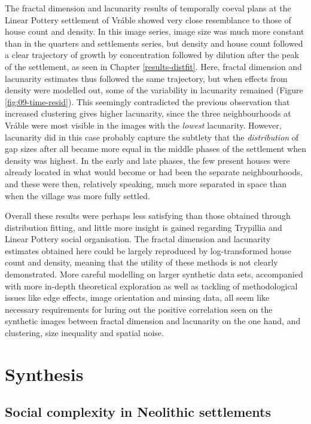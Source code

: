 \documentclass[
  12pt,
  a4paper, twoside]{book}
\begin{document}
The fractal dimension and lacunarity results of temporally coeval plans at the Linear Pottery settlement of Vráble showed very close resemblance to those of house count and density. In this image series, image size was much more constant than in the quarters and settlements series, but density and house count followed a clear trajectory of growth by concentration followed by dilution after the peak of the settlement, as seen in Chapter \ref{results-distfit}. Here, fractal dimension and lacunarity estimates thus followed the same trajectory, but when effects from density were modelled out, some of the variability in lacunarity remained (Figure \ref{fig:09-time-resid}). This seemingly contradicted the previous observation that increased clustering gives higher lacunarity, since the three neighbourhoods at Vráble were most visible in the images with the \emph{lowest} lacunarity. However, lacunarity did in this case probably capture the subtlety that the \emph{distribution} of gap sizes after all became more equal in the middle phases of the settlement when density was highest. In the early and late phases, the few present houses were already located in what would become or had been the separate neighbourhoods, and these were then, relatively speaking, much more separated in space than when the village was more fully settled.

Overall these results were perhaps less satisfying than those obtained through distribution fitting, and little more insight is gained regarding Trypillia and Linear Pottery social organisation. The fractal dimension and lacunarity estimates obtained here could be largely reproduced by log-transformed house count and density, meaning that the utility of these methods is not clearly demonstrated. More careful modelling on larger synthetic data sets, accompanied with more in-depth theoretical exploration as well as tackling of methodological issues like edge effects, image orientation and missing data, all seem like necessary requirements for luring out the positive correlation seen on the synthetic images between fractal dimension and lacunarity on the one hand, and clustering, size inequality and spatial noise.

\hypertarget{part-synthesis}{%
\part{Synthesis}\label{part-synthesis}}

\hypertarget{disc-results}{%
\chapter{Social complexity in Neolithic settlements}\label{disc-results}}
\end{document}
